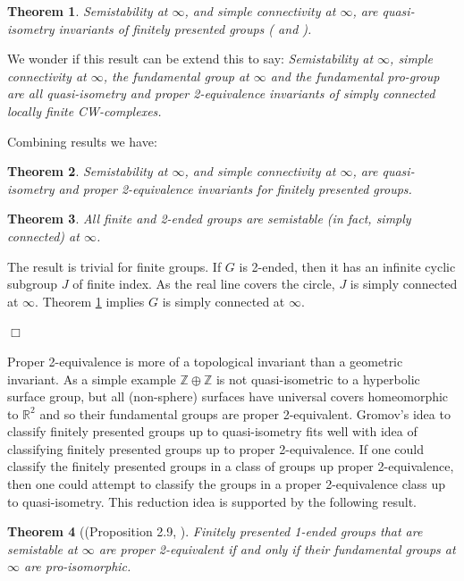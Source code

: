 \documentclass[12pt]{article}
\newtheorem{theorem}{Theorem}[subsection]
\newenvironment{proof}{\addvspace{12pt}\noindent{\bf Proof:}}{
$\Box$\par\addvspace{12pt}}
\begin{document}
\begin{theorem}\label{QIsp}   Semistability at $\infty$, and simple connectivity at $\infty$, are quasi-isometry invariants of finitely presented groups (\cite{G} and \cite{BR93}). 
\end{theorem}

We wonder if this result can be extend this to say: {\it Semistability at $\infty$, simple connectivity at $\infty$, the fundamental group at $\infty$  and the fundamental pro-group are all quasi-isometry and proper 2-equivalence invariants of simply connected locally finite CW-complexes.}

Combining results we have:

\begin{theorem}\label{ssqi} 
Semistability at $\infty$, and simple connectivity at $\infty$, 
are quasi-isometry and proper 2-equivalence invariants for finitely presented groups.
\end{theorem}

\begin{theorem}\label{Fin2E}
All finite and 2-ended groups are semistable (in fact, simply connected) at $\infty$. 
\end{theorem}
\begin{proof}
The result is trivial for finite groups. If $G$ is 2-ended, then it has an infinite cyclic subgroup $J$ of finite index. As the real line covers the circle, $J$ is simply connected at $\infty$. Theorem \ref{QIsp} implies $G$ is simply connected at $\infty$. 
\end{proof}


Proper 2-equivalence is more of a topological invariant than a geometric invariant.  As a simple example $\mathbb Z\oplus \mathbb Z$ is not quasi-isometric to a hyperbolic surface group, but all (non-sphere) surfaces have universal covers homeomorphic to $\mathbb R^2$ and so their fundamental groups are proper 2-equivalent. Gromov's idea to classify finitely presented groups up to quasi-isometry fits well with idea of classifying finitely presented groups up to proper 2-equivalence. If one could classify the finitely presented groups in a class of groups up proper 2-equivalence, then one could attempt to classify the groups in a proper 2-equivalence class up to quasi-isometry. This reduction idea is supported by the following result. 


\begin{theorem} [(Proposition 2.9, \cite{CLQR20}] \label{fgi-2eq}
Finitely presented 1-ended groups that are semistable at $\infty$ are proper 2-equivalent if and only if their fundamental groups at $\infty$ are pro-isomorphic. 
\end{theorem}
\end{document}
